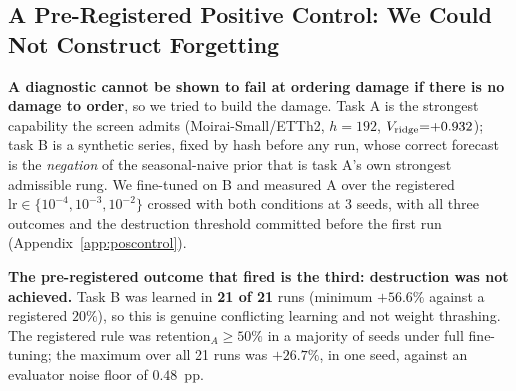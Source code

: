 \subsection{A Pre-Registered Positive Control: We Could Not Construct Forgetting}
\label{sec:exp4:poscontrol}
\textbf{A diagnostic cannot be shown to fail at
ordering damage if there is no damage to order}, so we tried to build the
damage.  Task A is the strongest capability the screen admits
(Moirai-Small/ETTh2, $h{=}192$, $V_{\text{ridge}}{=}{+}0.932$); task B is a
synthetic series, fixed by hash before any run, whose correct forecast is the
\emph{negation} of the seasonal-naive prior that is task A's own strongest
admissible rung.  We fine-tuned on B and measured A over the registered
$\text{lr}\in\{10^{-4},10^{-3},10^{-2}\}$ crossed with both conditions at 3 seeds,
with all three outcomes and the destruction threshold committed before the first
run (Appendix~\ref{app:poscontrol}).

\textbf{The pre-registered outcome that fired is the third: destruction was not
achieved.}  Task B was learned in \textbf{21 of 21} runs (minimum $+56.6\%$
against a registered $20\%$), so this is genuine conflicting learning and not
weight thrashing.  The registered rule was
retention$_A\!\geq\!50\%$ in a majority of seeds under full fine-tuning; the
maximum over all 21 runs was $+26.7\%$, in one seed, against an evaluator noise
floor of $0.48$~pp.

